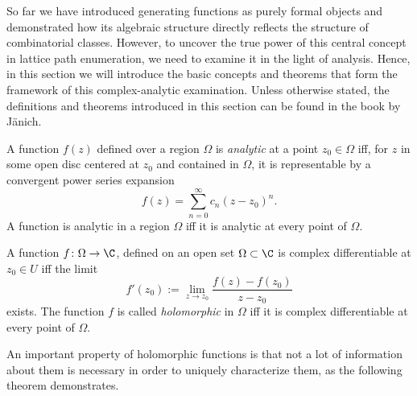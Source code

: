 
So far we have introduced generating functions as purely formal objects and demonstrated how its algebraic structure directly reflects the structure of combinatorial classes. 
However, to uncover the true power of this central concept in lattice path enumeration, we need to examine it in the light of analysis. 
Hence, in this section we will introduce the basic concepts and theorems that form the framework of this complex-analytic examination. 
Unless otherwise stated, the definitions and theorems introduced in this section can be found in the book \cite{Funktionentheorie} by Jänich.

\begin{definition}
  A function $f(z)$ defined over a region $\Omega$ is \textit{analytic} at a point $z_{0} \in \Omega$ iff, for $z$ in some open disc centered at $z_0$ and contained in $\Omega$, it is representable by a convergent power series expansion
  $$
    f(z) = \sum_{n=0}^{\infty}c_{n}(z-z_{0})^{n}.
  $$
  A function is analytic in a region $\Omega$ iff it is analytic at every point of $\Omega$.
\end{definition}

\begin{definition}
  A function $f\colon \Omega \to \C$, defined on an open set $\Omega \subset \C$ is complex differentiable at $z_{0} \in U$ iff the limit
  $$
    f'(z_{0}) := \lim_{z \to z_{0}} \frac{f(z) - f(z_{0})}{z - z_{0}}
  $$
  exists. The function $f$ is called \textit{holomorphic} in $\Omega$ iff it is complex differentiable at every point of $\Omega$.
\end{definition}

An important property of holomorphic functions is that not a lot of information about them is necessary in order to uniquely characterize them, as the following theorem demonstrates.

